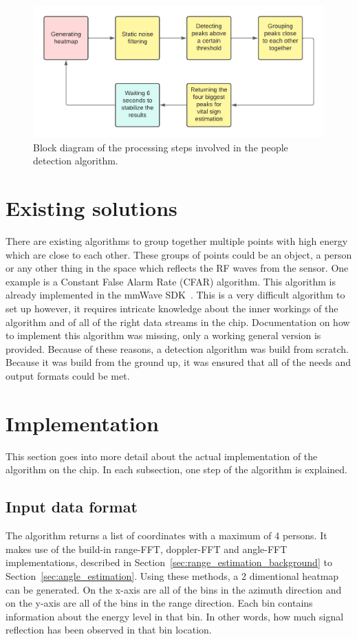 \begin{figure}[t]
\centering
\includegraphics[width=.9\textwidth]{figures/people_detection/People detection algorithm.pdf}
\caption{Block diagram of the processing steps involved in the people detection algorithm.}
\label{fig:people_detection_block_diagram}
\end{figure}

\section{Existing solutions}
There are existing algorithms to group together multiple points with high energy which are close to each other. These groups of points could be an object, a person or any other thing in the space which reflects the RF waves from the sensor. One example is a Constant False Alarm Rate (CFAR) algorithm. This algorithm is already implemented in the mmWave SDK~\cite{mmwavesdk_website}. This is a very difficult algorithm to set up however, it requires intricate knowledge about the inner workings of the algorithm and of all of the right data streams in the chip. Documentation on how to implement this algorithm was missing, only a working general version is provided. Because of these reasons, a detection algorithm was build from scratch. Because it was build from the ground up, it was ensured that all of the needs and output formats could be met.

\section{Implementation}
\label{sec:people_detection_implementation}
This section goes into more detail about the actual implementation of the algorithm on the chip. In each subsection, one step of the algorithm is explained.

\subsection{Input data format}
The algorithm returns a list of coordinates with a maximum of 4 persons. It makes use of the build-in range-FFT, doppler-FFT and angle-FFT implementations, described in Section~\ref{sec:range_estimation_background} to Section~\ref{sec:angle_estimation}. Using these methods, a 2 dimentional heatmap can be generated. On the x-axis are all of the bins in the azimuth direction and on the y-axis are all of the bins in the range direction. Each bin contains information about the energy level in that bin. In other words, how much signal reflection has been observed in that bin location. 


